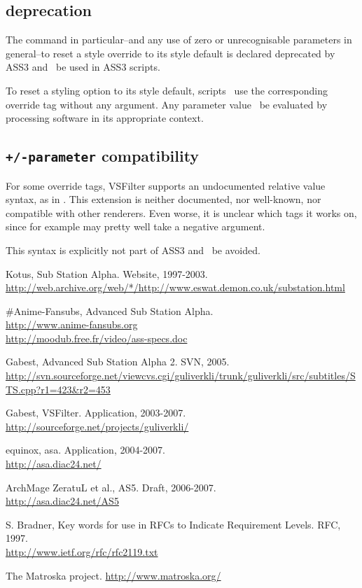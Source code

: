 \documentclass{spec}
\begin{document}
\subsection{ deprecation}

The  command in particular--and any use of zero or unrecognisable
parameters in general--to reset a style override to its style default is
declared deprecated by ASS3 and \mustnot\ be used in ASS3 scripts.

To reset a styling option to its style default, scripts \may\ use the
corresponding override tag without any argument. Any parameter value
\must\ be evaluated by processing software in its appropriate context.

\subsection{\texttt{+/-parameter} compatibility}

For some override tags, VSFilter supports an undocumented relative value
syntax, as in . This extension is neither documented, nor well-known,
nor compatible with other renderers. Even worse, it is unclear which tags
it works on, since for example  may pretty well take a negative
argument.

This syntax is explicitly not part of ASS3 and \should\ be avoided.

\begin{thebibliography}{1}
 Kotus, Sub Station Alpha. Website, 1997-2003.\\
\url{http://web.archive.org/web/*/http://www.eswat.demon.co.uk/substation.html}

 \#Anime-Fansubs, Advanced Sub Station Alpha.\\
\url{http://www.anime-fansubs.org}\\
\url{http://moodub.free.fr/video/ass-specs.doc}

 Gabest, Advanced Sub Station Alpha 2. SVN, 2005.\\
\url{http://svn.sourceforge.net/viewcvs.cgi/guliverkli/trunk/guliverkli/src/subtitles/STS.cpp?r1=423&r2=453}

 Gabest, VSFilter. Application, 2003-2007.\\
\url{http://sourceforge.net/projects/guliverkli/}

 equinox, asa. Application, 2004-2007.\\
\url{http://asa.diac24.net/}

 ArchMage ZeratuL et al., AS5. Draft, 2006-2007.\\
\url{http://asa.diac24.net/AS5}

 S. Bradner, Key words for use in RFCs to Indicate Requirement Levels. RFC, 1997.\\
\url{http://www.ietf.org/rfc/rfc2119.txt}

 The Matroska project.
\url{http://www.matroska.org/}

\end{thebibliography}
\end{document}

